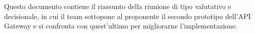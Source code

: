 Questo documento contiene il riassunto della riunione di tipo valutativo e decisionale, in cui il team sottopone al proponente il secondo prototipo dell'API Gateway e si confronta con quest'ultimo per migliorarne l'implementazione.
